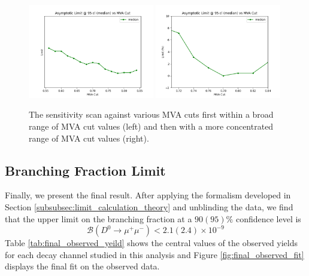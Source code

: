 \begin{figure}[h!]
    \begin{center}
      \includegraphics[width=0.49\textwidth]{figures/chapter4/results/limit_bdt_median.png}
      \includegraphics[width=0.49\textwidth]{figures/chapter4/results/limit_bdt_median_v2.png}\\
    \end{center}
    \caption{
      The sensitivity scan against various MVA cuts first within a broad range of MVA cut values (left) and then with a more concentrated range of MVA cut values (right).
    }
    \label{fig:sensitivity_scan}
\end{figure}

\subsection{Branching Fraction Limit}
\label{subsec:final_result}

Finally, we present the final result. After applying the formalism developed in Section \ref{subsubsec:limit_calculation_theory} and unblinding the data, we find that the upper limit on the branching fraction at a $90(95)\%$ confidence level is
\begin{equation}
    \mathcal{B}(D^0 \to \mu^+ \mu^-) < 2.1(2.4) \times 10^{-9} 
\end{equation}
Table \ref{tab:final_observed_yeild} shows the central values of the observed yields for each decay channel studied in this analysis and Figure \ref{fig:final_observed_fit} displays the final fit on the observed data.

